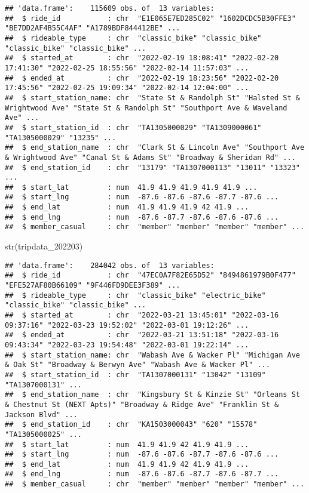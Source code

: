 \documentclass[
]{article}
\newenvironment{Shaded}{\begin{snugshade}}{\end{snugshade}}
\newcommand{\FunctionTok}[1]{\textcolor[rgb]{0.00,0.00,0.00}{#1}}
\newcommand{\NormalTok}[1]{#1}
\begin{document}
\begin{verbatim}
## 'data.frame':    115609 obs. of  13 variables:
##  $ ride_id           : chr  "E1E065E7ED285C02" "1602DCDC5B30FFE3" "BE7DD2AF4B55C4AF" "A1789BDF844412BE" ...
##  $ rideable_type     : chr  "classic_bike" "classic_bike" "classic_bike" "classic_bike" ...
##  $ started_at        : chr  "2022-02-19 18:08:41" "2022-02-20 17:41:30" "2022-02-25 18:55:56" "2022-02-14 11:57:03" ...
##  $ ended_at          : chr  "2022-02-19 18:23:56" "2022-02-20 17:45:56" "2022-02-25 19:09:34" "2022-02-14 12:04:00" ...
##  $ start_station_name: chr  "State St & Randolph St" "Halsted St & Wrightwood Ave" "State St & Randolph St" "Southport Ave & Waveland Ave" ...
##  $ start_station_id  : chr  "TA1305000029" "TA1309000061" "TA1305000029" "13235" ...
##  $ end_station_name  : chr  "Clark St & Lincoln Ave" "Southport Ave & Wrightwood Ave" "Canal St & Adams St" "Broadway & Sheridan Rd" ...
##  $ end_station_id    : chr  "13179" "TA1307000113" "13011" "13323" ...
##  $ start_lat         : num  41.9 41.9 41.9 41.9 41.9 ...
##  $ start_lng         : num  -87.6 -87.6 -87.6 -87.7 -87.6 ...
##  $ end_lat           : num  41.9 41.9 41.9 42 41.9 ...
##  $ end_lng           : num  -87.6 -87.7 -87.6 -87.6 -87.6 ...
##  $ member_casual     : chr  "member" "member" "member" "member" ...
\end{verbatim}

\begin{Shaded}
\begin{Highlighting}[]
\FunctionTok{str}\NormalTok{(tripdata\_202203)}
\end{Highlighting}
\end{Shaded}

\begin{verbatim}
## 'data.frame':    284042 obs. of  13 variables:
##  $ ride_id           : chr  "47EC0A7F82E65D52" "8494861979B0F477" "EFE527AF80B66109" "9F446FD9DEE3F389" ...
##  $ rideable_type     : chr  "classic_bike" "electric_bike" "classic_bike" "classic_bike" ...
##  $ started_at        : chr  "2022-03-21 13:45:01" "2022-03-16 09:37:16" "2022-03-23 19:52:02" "2022-03-01 19:12:26" ...
##  $ ended_at          : chr  "2022-03-21 13:51:18" "2022-03-16 09:43:34" "2022-03-23 19:54:48" "2022-03-01 19:22:14" ...
##  $ start_station_name: chr  "Wabash Ave & Wacker Pl" "Michigan Ave & Oak St" "Broadway & Berwyn Ave" "Wabash Ave & Wacker Pl" ...
##  $ start_station_id  : chr  "TA1307000131" "13042" "13109" "TA1307000131" ...
##  $ end_station_name  : chr  "Kingsbury St & Kinzie St" "Orleans St & Chestnut St (NEXT Apts)" "Broadway & Ridge Ave" "Franklin St & Jackson Blvd" ...
##  $ end_station_id    : chr  "KA1503000043" "620" "15578" "TA1305000025" ...
##  $ start_lat         : num  41.9 41.9 42 41.9 41.9 ...
##  $ start_lng         : num  -87.6 -87.6 -87.7 -87.6 -87.6 ...
##  $ end_lat           : num  41.9 41.9 42 41.9 41.9 ...
##  $ end_lng           : num  -87.6 -87.6 -87.7 -87.6 -87.7 ...
##  $ member_casual     : chr  "member" "member" "member" "member" ...
\end{verbatim}
\end{document}
